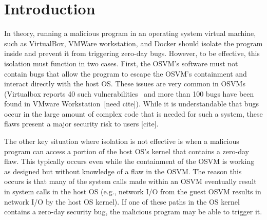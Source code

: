 \section{Introduction}
\label{sec.introduction}

%

In theory, running a malicious program in an operating system virtual 
machine, such as VirtualBox, VMWare workstation, and Docker should isolate the
program inside and prevent it from triggering zero-day bugs.  However, to be 
effective, this isolation must function in two cases.  First, the OSVM's 
software must not contain bugs that allow the program to escape the 
OSVM's containment and interact directly with the host OS.  These
issues are very common in OSVMs (Virtualbox reports 40 such 
vulnerabilities~\cite{Virtualbox-Vulnerabilities} and more than 100 bugs have 
been found in VMware Workstation~[need cite]).  While it is understandable that
bugs occur in the large amount of complex code that is needed for such a 
system, these flaws present a major security risk to users [cite].


The other key situation where isolation is not effective is when a malicious 
program  can access a portion of the host OS's kernel that contains a 
zero-day flaw.  This typically occurs even while the containment of the OSVM is 
working as designed but without knowledge of a flaw in the OSVM.  The reason
this occurs is that many of the system calls made within an OSVM eventually 
result in system calls in the host OS (e.g., network I/O from the guest
OSVM results in network I/O by the host OS kernel).  If one of these paths in
the OS kernel contains a zero-day security bug, the malicious program
may be able to trigger it.


